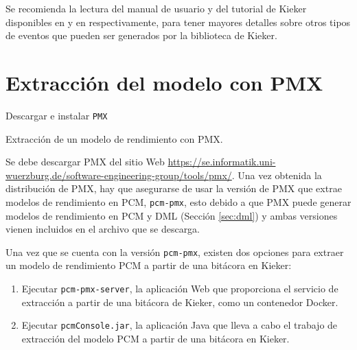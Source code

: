 
Se recomienda la lectura del manual de usuario y del tutorial de Kieker disponibles en \cite{kieker-user-guide} y en \cite{kieker-icpe-tutorial-2014} respectivamente, para tener mayores detalles sobre otros tipos de eventos que pueden ser generados por la biblioteca de Kieker.

\section{Extracción del modelo con PMX}

\begin{singlespace}
\begin{algorithm}[H]
\SetAlgoLined

Descargar e instalar \texttt{PMX}\;
\caption{Extracción de un modelo de rendimiento con PMX.}
\end{algorithm}
\end{singlespace}


Se debe descargar PMX del sitio Web \url{https://se.informatik.uni-wuerzburg.de/software-engineering-group/tools/pmx/}. Una vez obtenida la distribución de PMX, hay que asegurarse de usar la versión de PMX que extrae modelos de rendimiento en PCM, \texttt{pcm-pmx}, esto debido a que PMX puede generar modelos de rendimiento en PCM y DML (Sección \ref{sec:dml}) y ambas versiones vienen incluidos en el archivo que se descarga.

Una vez que se cuenta con la versión \texttt{pcm-pmx}, existen dos opciones para extraer un modelo de rendimiento PCM a partir de una bitácora en Kieker:
\begin{enumerate}
    \item Ejecutar \texttt{pcm-pmx-server}, la aplicación Web que proporciona el servicio de extracción a partir de una bitácora de Kieker, como un contenedor Docker.
    \item Ejecutar \texttt{pcmConsole.jar}, la aplicación Java que lleva a cabo el trabajo de extracción del modelo PCM a partir de una bitácora en Kieker.
\end{enumerate}

